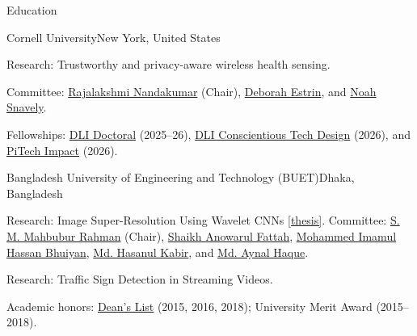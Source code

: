 \documentclass{resume} %
\begin{document}
\begin{rSection}{Education}
\begin{rEducationSubsection}{Cornell University}{New York, United States}
\begin{educationDetails}
\item Research: Trustworthy and privacy-aware wireless health sensing.
\item Committee: \href{https://infosci.cornell.edu/~rajalakshmi/}{Rajalakshmi Nandakumar} (Chair), \href{https://destrin.tech.cornell.edu/}{Deborah Estrin}, and \href{https://www.cs.cornell.edu/~snavely/}{Noah Snavely}.
\item Fellowships: \href{https://dli.tech.cornell.edu/doctoralfellows}{DLI Doctoral} (2025--26), \href{https://conscientious.tech.cornell.edu/}{DLI Conscientious Tech Design} (2026), and \href{https://www.pi.tech.cornell.edu/pitech-phd-impact-fellowship}{PiTech Impact} (2026).
\end{educationDetails}
\end{rEducationSubsection}

\begin{rEducationSubsection}{Bangladesh University of Engineering and Technology (BUET)}{Dhaka, Bangladesh}
\begin{educationDetails}
\item Research: Image Super-Resolution Using Wavelet CNNs \href{http://lib.buet.ac.bd:8080/xmlui/handle/123456789/6615}{[thesis]}. Committee: \href{https://scholar.google.com/citations?user=VFe2plAAAAAJ&hl=en}{S. M. Mahbubur Rahman} (Chair), \href{https://scholar.google.com/citations?user=qDG3vBUAAAAJ&hl=en&oi=ao}{Shaikh Anowarul Fattah}, \href{https://scholar.google.com/citations?user=pn8CJdYAAAAJ&hl=en}{Mohammed Imamul Hassan Bhuiyan}, \href{https://scholar.google.com/citations?user=LIl1Y-0AAAAJ&hl=en}{Md. Hasanul Kabir}, and \href{https://eee.buet.ac.bd/people/faculty/dmayh}{Md. Aynal Haque}.
\end{educationDetails}
\begin{educationDetails}
\item Research: Traffic Sign Detection in Streaming Videos.
\item Academic honors: \href{https://cse.buet.ac.bd/academics/fund}{Dean's List} (2015, 2016, 2018); University Merit Award (2015--2018).
\end{educationDetails}
\end{rEducationSubsection}


\end{rSection}
\end{document}
